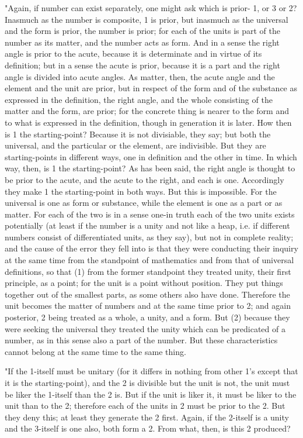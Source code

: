 "Again, if number can exist separately, one might ask which is prior-
1, or 3 or 2? Inasmuch as the number is composite, 1 is prior, but
inasmuch as the universal and the form is prior, the number is prior;
for each of the units is part of the number as its matter, and the
number acts as form. And in a sense the right angle is prior to the
acute, because it is determinate and in virtue of its definition;
but in a sense the acute is prior, because it is a part and the right
angle is divided into acute angles. As matter, then, the acute angle
and the element and the unit are prior, but in respect of the form
and of the substance as expressed in the definition, the right angle,
and the whole consisting of the matter and the form, are prior; for
the concrete thing is nearer to the form and to what is expressed
in the definition, though in generation it is later. How then is 1
the starting-point? Because it is not divisiable, they say; but both
the universal, and the particular or the element, are indivisible.
But they are starting-points in different ways, one in definition
and the other in time. In which way, then, is 1 the starting-point?
As has been said, the right angle is thought to be prior to the acute,
and the acute to the right, and each is one. Accordingly they make
1 the starting-point in both ways. But this is impossible. For the
universal is one as form or substance, while the element is one as
a part or as matter. For each of the two is in a sense one-in truth
each of the two units exists potentially (at least if the number is
a unity and not like a heap, i.e. if different numbers consist of
differentiated units, as they say), but not in complete reality; and
the cause of the error they fell into is that they were conducting
their inquiry at the same time from the standpoint of mathematics
and from that of universal definitions, so that (1) from the former
standpoint they treated unity, their first principle, as a point;
for the unit is a point without position. They put things together
out of the smallest parts, as some others also have done. Therefore
the unit becomes the matter of numbers and at the same time prior
to 2; and again posterior, 2 being treated as a whole, a unity, and
a form. But (2) because they were seeking the universal they treated
the unity which can be predicated of a number, as in this sense also
a part of the number. But these characteristics cannot belong at the
same time to the same thing. 

"If the 1-itself must be unitary (for it differs in nothing from other
1's except that it is the starting-point), and the 2 is divisible
but the unit is not, the unit must be liker the 1-itself than the
2 is. But if the unit is liker it, it must be liker to the unit than
to the 2; therefore each of the units in 2 must be prior to the 2.
But they deny this; at least they generate the 2 first. Again, if
the 2-itself is a unity and the 3-itself is one also, both form a
2. From what, then, is this 2 produced? 

